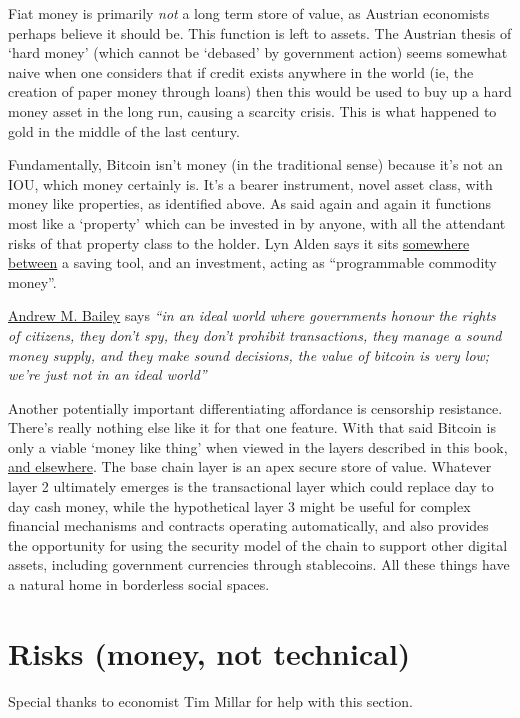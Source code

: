 Fiat money is primarily \textit{not} a long term store of value, as Austrian economists perhaps believe it should be. This function is left to assets. The Austrian thesis of `hard money' (which cannot be `debased' by government action) seems somewhat naive when one considers that if credit exists anywhere in the world (ie, the creation of paper money through loans) then this would be used to buy up a hard money asset in the long run, causing a scarcity crisis. This is what happened to gold in the middle of the last century. \par 
Fundamentally, Bitcoin isn't money (in the traditional sense) because it's not an IOU, which money certainly is. It's a bearer instrument, novel asset class, with money like properties, as identified above. As said again and again it functions most like a `property' which can be invested in by anyone, with all the attendant risks of that property class to the holder. Lyn Alden says it sits \href{https://www.lynalden.com/what-is-money/}{somewhere between} a saving tool, and an investment, acting as ``programmable commodity money''.\par 
\href{https://andrewmbailey.com/}{Andrew M. Bailey} says \textit{``in an ideal world where governments honour the rights of citizens, they don't spy, they don't prohibit transactions, they manage a sound money supply, and they make sound decisions, the value of bitcoin is very low; we're just not in an ideal world''}\par
Another potentially important differentiating affordance is censorship resistance. There's really nothing else like it for that one feature. With that said Bitcoin is only a viable `money like thing' when viewed in the layers described in this book, \href{https://giacomozucco.com/layers-before-bitcoin}{and elsewhere}\cite{Bhatia2021}. The base chain layer is an apex secure store of value. Whatever layer 2 ultimately emerges is the transactional layer which could replace day to day cash money, while the hypothetical layer 3 might be useful for complex financial mechanisms and contracts operating automatically, and also provides the opportunity for using the security model of the chain to support other digital assets, including government currencies through stablecoins. All these things have a natural home in borderless social spaces.
\section{Risks (money, not technical)}
Special thanks to economist Tim Millar for help with this section.
